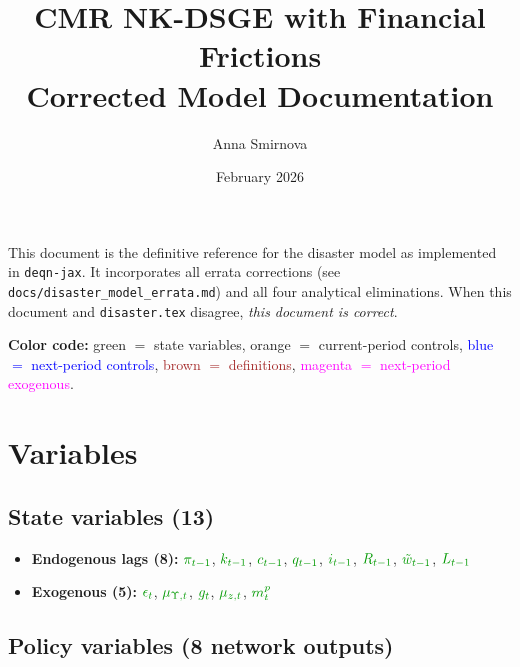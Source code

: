\documentclass[11pt]{article}
\title{CMR NK-DSGE with Financial Frictions\\[4pt]
\large Corrected Model Documentation}
\author{Anna Smirnova}
\date{February 2026}
\begin{document}
\maketitle

\noindent This document is the definitive reference for the disaster model as
implemented in \texttt{deqn-jax}. It incorporates all errata corrections
(see \texttt{docs/disaster\_model\_errata.md}) and all four analytical
eliminations. When this document and \texttt{disaster.tex} disagree,
\emph{this document is correct}.

\bigskip\noindent
\textbf{Color code:}
\textcolor{green!60!black}{green $=$ state variables},
\textcolor{orange!80!black}{orange $=$ current-period controls},
\textcolor{blue}{blue $=$ next-period controls},
\textcolor{brown}{brown $=$ definitions},
\textcolor{magenta}{magenta $=$ next-period exogenous}.


\section{Variables}

\subsection{State variables (13)}

\begin{itemize}
\item \textbf{Endogenous lags (8):}\;
  $\textcolor{green!60!black}{\pi_{t-1}}$,\;
  $\textcolor{green!60!black}{k_{t-1}}$,\;
  $\textcolor{green!60!black}{c_{t-1}}$,\;
  $\textcolor{green!60!black}{q_{t-1}}$,\;
  $\textcolor{green!60!black}{i_{t-1}}$,\;
  $\textcolor{green!60!black}{R_{t-1}}$,\;
  $\textcolor{green!60!black}{\tilde{w}_{t-1}}$,\;
  $\textcolor{green!60!black}{L_{t-1}}$

\item \textbf{Exogenous (5):}\;
  $\textcolor{green!60!black}{\epsilon_t}$,\;
  $\textcolor{green!60!black}{\mu_{\Upsilon,t}}$,\;
  $\textcolor{green!60!black}{g_t}$,\;
  $\textcolor{green!60!black}{\mu_{z,t}}$,\;
  $\textcolor{green!60!black}{m_t^p}$
\end{itemize}

\subsection{Policy variables (8 network outputs)}
\end{document}
